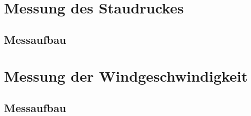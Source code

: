 \section{Messung des Staudruckes}
\subsection{Messaufbau}
\section{Messung der Windgeschwindigkeit}
\subsection{Messaufbau}